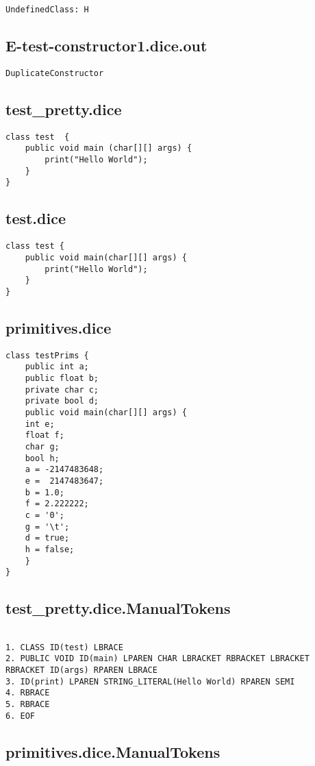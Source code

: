 \begin{verbatim}
UndefinedClass: H

\end{verbatim}\pagebreak\subsection{E-test-constructor1.dice.out}
\begin{verbatim}
DuplicateConstructor 

\end{verbatim}\pagebreak\subsection{test_pretty.dice}
\begin{verbatim}
class test  {
	public void main (char[][] args) {
		print("Hello World");
	}
}

\end{verbatim}\pagebreak\subsection{test.dice}
\begin{verbatim}
class test {
	public void main(char[][] args) {
		print("Hello World");
	}
}
\end{verbatim}\pagebreak\subsection{primitives.dice}
\begin{verbatim}
class testPrims {
	public int a;
	public float b;
	private char c;
	private bool d;
	public void main(char[][] args) {
	int e;
	float f;
	char g;
	bool h;
	a = -2147483648;
	e =  2147483647;
	b = 1.0;
	f = 2.222222;
	c = '0';
	g = '\t';
	d = true;
	h = false;
	}
}
\end{verbatim}\pagebreak\subsection{test_pretty.dice.ManualTokens}
\begin{verbatim}

1. CLASS ID(test) LBRACE
2. PUBLIC VOID ID(main) LPAREN CHAR LBRACKET RBRACKET LBRACKET RBRACKET ID(args) RPAREN LBRACE
3. ID(print) LPAREN STRING_LITERAL(Hello World) RPAREN SEMI
4. RBRACE
5. RBRACE
6. EOF

\end{verbatim}\pagebreak\subsection{primitives.dice.ManualTokens}
